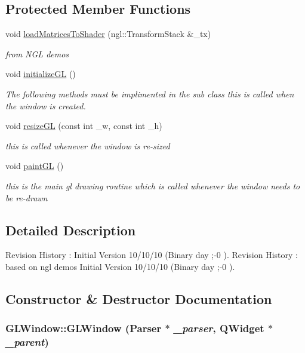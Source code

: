 \subsection*{Protected Member Functions}
\begin{DoxyCompactItemize}
\item 
void \hyperlink{classGLWindow_ab78209ce50dd6820686aa05fc242eb7a}{loadMatricesToShader} (ngl::TransformStack \&\_\-tx)
\begin{DoxyCompactList}\small\item\em from NGL demos \item\end{DoxyCompactList}\item 
void \hyperlink{classGLWindow_a39e39761cd7323806917a217cc7caea5}{initializeGL} ()
\begin{DoxyCompactList}\small\item\em The following methods must be implimented in the sub class this is called when the window is created. \item\end{DoxyCompactList}\item 
void \hyperlink{classGLWindow_abe57c0f40e59cba4c98759121e22eb47}{resizeGL} (const int \_\-w, const int \_\-h)
\begin{DoxyCompactList}\small\item\em this is called whenever the window is re-\/sized \item\end{DoxyCompactList}\item 
void \hyperlink{classGLWindow_a9bd2503dd5f812c10a9481f22ecd3403}{paintGL} ()
\begin{DoxyCompactList}\small\item\em this is the main gl drawing routine which is called whenever the window needs to be re-\/drawn \item\end{DoxyCompactList}\end{DoxyCompactItemize}


\subsection{Detailed Description}
Revision History : Initial Version 10/10/10 (Binary day ;-\/0 ). Revision History : based on ngl demos Initial Version 10/10/10 (Binary day ;-\/0 ). 

\subsection{Constructor \& Destructor Documentation}
\hypertarget{classGLWindow_a9990e7ea36d81bffec2cec95dc4513ba}{
\subsubsection[{GLWindow}]{\setlength{\rightskip}{0pt plus 5cm}GLWindow::GLWindow ({\bf Parser} $\ast$ {\em \_\-parser}, \/  QWidget $\ast$ {\em \_\-parent})}}
\label{classGLWindow_a9990e7ea36d81bffec2cec95dc4513ba}



